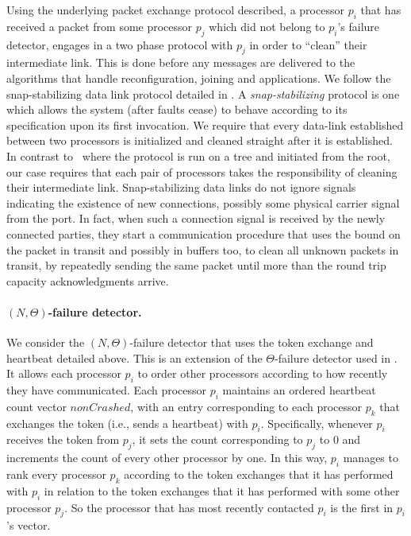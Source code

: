\documentclass[11pt]{article}
\begin{document}
Using the underlying packet exchange protocol described, a processor $p_i$ that has received a packet from some processor $p_j$ which did not belong to $p_i$'s failure detector, engages in a two phase protocol with $p_j$ in order to ``clean'' their intermediate link. 
This is done before any messages are delivered to the algorithms that handle reconfiguration, joining and applications.
We follow the snap-stabilizing data link protocol detailed in \cite{DBLP:journals/tcs/DolevT09}.
A \emph{snap-stabilizing} protocol is one which allows the system (after faults cease) to behave according to its specification upon its first invocation.
We require that every data-link established between two processors is initialized and cleaned straight after it is established.
In contrast to~\cite{DBLP:journals/tcs/DolevT09} where the protocol is run on a tree and initiated from the root, our case requires that each pair of processors takes the responsibility of cleaning their intermediate link.
Snap-stabilizing data links do not ignore signals indicating the existence of new connections, possibly some physical carrier signal from the port. 
In fact, when such a connection signal is received by the newly connected parties, they start a communication procedure that uses the bound on the packet in transit and possibly in buffers too, to clean all unknown packets in transit, by repeatedly sending the same packet until more than the round trip capacity acknowledgments arrive.\vspace{.3em}









\paragraph{$(N,\Theta)$-failure detector.} We consider the $(N,\Theta)$-failure detector that uses the token exchange and heartbeat detailed above.
This is an extension of the $\Theta$-failure detector used in \cite{Blanchard2013SSPaxos}. 
It allows each processor $p_i$ to order other processors according to how recently they have communicated.
Each processor $p_i$ maintains an ordered heartbeat count vector $nonCrashed$, with an entry corresponding to each processor $p_k$ that exchanges the token (i.e., sends a heartbeat) with $p_i$.
Specifically, whenever $p_i$ receives the token from $p_j$, it sets the count corresponding to $p_j$ to $0$ and increments the count of every other processor by one.
In this way, $p_i$ manages to rank every processor $p_k$ according to the token exchanges that it has performed with $p_i$ in relation to the token exchanges that it has performed with some other processor $p_j$.
So the processor that has most recently contacted $p_i$ is the first in $p_i$'s vector.
\end{document}
